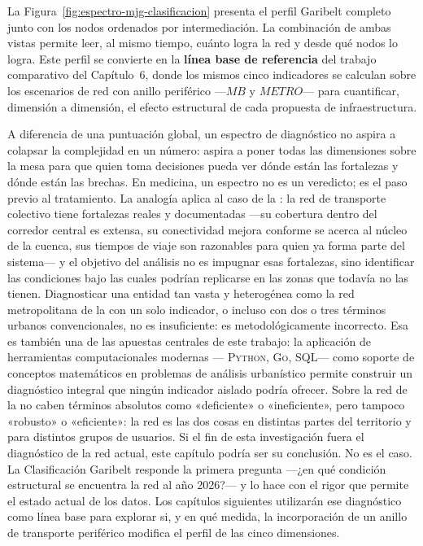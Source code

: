 La Figura~\ref{fig:espectro-mjg-clasificacion} presenta el perfil Garibelt
completo junto con los nodos ordenados por intermediación. La combinación de ambas vistas
permite leer, al mismo tiempo, cuánto logra la red y desde qué nodos lo logra.
Este perfil se convierte en la \textbf{línea base de referencia} del trabajo
comparativo del Capítulo~6, donde los mismos cinco indicadores se calculan sobre
los escenarios de red con anillo periférico ---$MB$ y $METRO$--- para
cuantificar, dimensión a dimensión, el efecto estructural de cada propuesta de
infraestructura.

A diferencia de una puntuación global, un espectro de diagnóstico no aspira a
colapsar la complejidad en un número: aspira a poner todas las dimensiones sobre
la mesa para que quien toma decisiones pueda ver dónde están las fortalezas y
dónde están las brechas. En medicina, un espectro no es un veredicto; es el paso
previo al tratamiento. La analogía aplica al caso de la \zmvm{}: la red de
transporte colectivo tiene fortalezas reales y documentadas ---su cobertura
dentro del corredor central es extensa, su conectividad mejora conforme se
acerca al núcleo de la cuenca, sus tiempos de viaje son razonables para quien ya
forma parte del sistema--- y el objetivo del análisis no es impugnar esas
fortalezas, sino identificar las condiciones bajo las cuales podrían replicarse
en las zonas que todavía no las tienen. Diagnosticar una entidad tan vasta y
heterogénea como la red metropolitana de la \zmvm{} con un solo indicador, o
incluso con dos o tres términos urbanos convencionales, no es insuficiente: es
metodológicamente incorrecto. Esa es también una de las apuestas centrales de
este trabajo: la aplicación de herramientas computacionales modernas ---
\textsc{Python}, \textsc{Go}, \textsc{SQL}--- como soporte de conceptos
matemáticos en problemas de análisis urbanístico permite construir un
diagnóstico integral que ningún indicador aislado podría ofrecer. Sobre la red
de la \zmvm{} no caben términos absolutos como «deficiente» o «ineficiente»,
pero tampoco «robusto» o «eficiente»: la red es las dos cosas en distintas
partes del territorio y para distintos grupos de usuarios. Si el fin de esta
investigación fuera el diagnóstico de la red actual, este capítulo podría ser su
conclusión. No es el caso. La Clasificación Garibelt responde la primera
pregunta ---¿en qué condición estructural se encuentra la red al año 2026?--- y
lo hace con el rigor que permite el estado actual de los datos. Los capítulos
siguientes utilizarán ese diagnóstico como línea base para explorar si, y en qué
medida, la incorporación de un anillo de transporte periférico modifica el
perfil de las cinco dimensiones.
